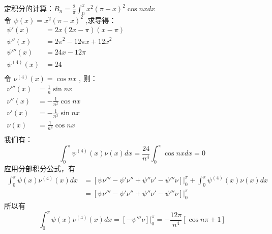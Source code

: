 \begin{remark}
定积分的计算：$B_n= \frac{2}{\pi} \int_{0}^{\pi}   x^2 (\pi-x)^2   \cos nx dx$ \\
令 $\psi (x) = x^2 (\pi-x)^2$ ,求导得：\\
		$\displaystyle \begin{array}{lllllllll}
		  \psi ' (x) &=  2x(2x - \pi )(x - \pi ) \\
		   \psi '' (x) &=  2\pi ^2 -12\pi x+12x^2 \\
		     \psi ''' (x) &=  24x -12 \pi \\
		     \psi^{(4)} (x) &=  24  \\
	\end{array}$ \\ 
令 $\nu^{(4)} (x) = \cos nx$ , 则：\\
	$\displaystyle \begin{array}{lllllllll}
		\nu ''' (x) &= \frac{1}{n} \sin nx \\
		\nu '' (x) &= -\frac{1}{n^2} \cos nx \\
		\nu ' (x) &= -\frac{1}{n^3} \sin nx \\
		\nu (x) &= \frac{1}{n^4} \cos nx \\
	\end{array}$ \\ 
我们有：\\
\begin{equation*}
	\int_{0}^{\pi}  \psi^{(4)} (x)  \nu (x)  dx = \frac{24}{n^4} \int_{0}^{\pi}  \cos nx dx =0
\end{equation*}
应用分部积分公式，有 \\
	$\displaystyle \begin{array}{lllllllll}
	\int_{0}^{\pi}  \psi (x) \nu^{(4)} (x)  dx &= [ \psi \nu''' - \psi' \nu'' + \psi'' \nu' -\psi''' \nu ]|_0 ^\pi +\int_{0}^{\pi}  \psi^{(4)} (x)  \nu (x)  dx  \\
	&=  [ \psi \nu''' - \psi' \nu'' + \psi'' \nu' -\psi''' \nu ]|_0 ^\pi 
	\end{array}$ \\ 
所以有
\begin{equation*}
	\int_{0}^{\pi}  \psi (x) \nu^{(4)} (x)  dx = [-\psi''' \nu ]|_0 ^\pi =  -\frac{12 \pi}{n^4}  [\cos n\pi +1 ]
\end{equation*}
\end{remark}

